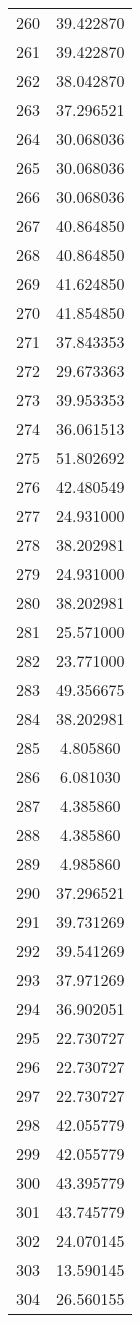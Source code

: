 \documentclass[12pt]{article}
\begin{document}
\begin{longtable}{@{}cc@{}}
260 & 39.422870 \\
261 & 39.422870 \\
262 & 38.042870 \\
263 & 37.296521 \\
264 & 30.068036 \\
265 & 30.068036 \\
266 & 30.068036 \\
267 & 40.864850 \\
268 & 40.864850 \\
269 & 41.624850 \\
270 & 41.854850 \\
271 & 37.843353 \\
272 & 29.673363 \\
273 & 39.953353 \\
274 & 36.061513 \\
275 & 51.802692 \\
276 & 42.480549 \\
277 & 24.931000 \\
278 & 38.202981 \\
279 & 24.931000 \\
280 & 38.202981 \\
281 & 25.571000 \\
282 & 23.771000 \\
283 & 49.356675 \\
284 & 38.202981 \\
285 & 4.805860 \\
286 & 6.081030 \\
287 & 4.385860 \\
288 & 4.385860 \\
289 & 4.985860 \\
290 & 37.296521 \\
291 & 39.731269 \\
292 & 39.541269 \\
293 & 37.971269 \\
294 & 36.902051 \\
295 & 22.730727 \\
296 & 22.730727 \\
297 & 22.730727 \\
298 & 42.055779 \\
299 & 42.055779 \\
300 & 43.395779 \\
301 & 43.745779 \\
302 & 24.070145 \\
303 & 13.590145 \\
304 & 26.560155 \\

\end{longtable}
\end{document}
